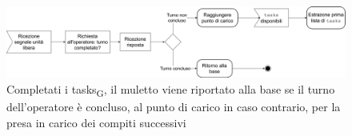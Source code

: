 \begin{figure}[H]
	\centering
	\includegraphics[scale=0.35]{res/images/diagramma_di_attivita1.png}
	\caption[Diagramma di \gls{attivita}\textsubscript{G} per la gestione del muletto dopo il completamento della lista di tasks]{Completati i \glspl{task}\textsubscript{G}, il muletto viene riportato alla base se il turno dell'operatore è concluso, al punto di carico in caso contrario, per la presa in carico dei compiti successivi}
\end{figure}



